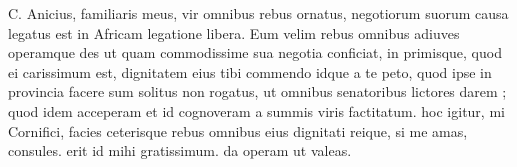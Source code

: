 


 C. Anicius, familiaris meus, vir omnibus rebus ornatus, negotiorum suorum causa legatus est in Africam legatione libera. Eum velim rebus omnibus adiuves operamque des ut quam commodissime sua negotia conficiat, in primisque, quod ei carissimum est, dignitatem eius tibi commendo idque a te peto, quod ipse in provincia facere sum solitus non rogatus, ut omnibus senatoribus lictores darem ; quod idem acceperam et id cognoveram a summis viris factitatum. hoc igitur, mi Cornifici, facies ceterisque rebus omnibus eius dignitati reique, si me amas, consules. erit id mihi gratissimum. da operam ut valeas.
